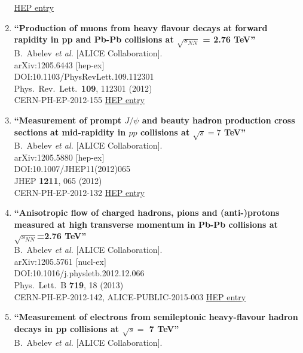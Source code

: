 \begin{enumerate}
\href{http://inspirehep.net/record/1117885}{HEP entry}
\item%
{\bf ``Production of muons from heavy flavour decays at forward rapidity in pp and Pb-Pb collisions at $\sqrt {s_{NN}}$ = 2.76 TeV''}
  \\{}B.~Abelev {\it et al.} [ALICE Collaboration].
  \\{}arXiv:1205.6443 [hep-ex]
  \\{}DOI:10.1103/PhysRevLett.109.112301
  \\{}Phys.\ Rev.\ Lett.\  {\bf 109}, 112301 (2012)
  \\{}CERN-PH-EP-2012-155
\href{http://inspirehep.net/record/1116417}{HEP entry}
\item%
{\bf ``Measurement of prompt $J/\psi$ and beauty hadron production cross sections at mid-rapidity in $pp$ collisions at $\sqrt{s} = 7$ TeV''}
  \\{}B.~Abelev {\it et al.} [ALICE Collaboration].
  \\{}arXiv:1205.5880 [hep-ex]
  \\{}DOI:10.1007/JHEP11(2012)065
  \\{}JHEP {\bf 1211}, 065 (2012)
  \\{}CERN-PH-EP-2012-132
\href{http://inspirehep.net/record/1116251}{HEP entry}
\item%
{\bf ``Anisotropic flow of charged hadrons, pions and (anti-)protons measured at high transverse momentum in Pb-Pb collisions at $\sqrt{s_{NN}}$=2.76 TeV''}
  \\{}B.~Abelev {\it et al.} [ALICE Collaboration].
  \\{}arXiv:1205.5761 [nucl-ex]
  \\{}DOI:10.1016/j.physletb.2012.12.066
  \\{}Phys.\ Lett.\ B {\bf 719}, 18 (2013)
  \\{}CERN-PH-EP-2012-142, ALICE-PUBLIC-2015-003
\href{http://inspirehep.net/record/1116150}{HEP entry}
\item%
{\bf ``Measurement of electrons from semileptonic heavy-flavour hadron decays in pp collisions at $\sqrt{s} =$ 7 TeV''}
  \\{}B.~Abelev {\it et al.} [ALICE Collaboration].

\end{enumerate}
